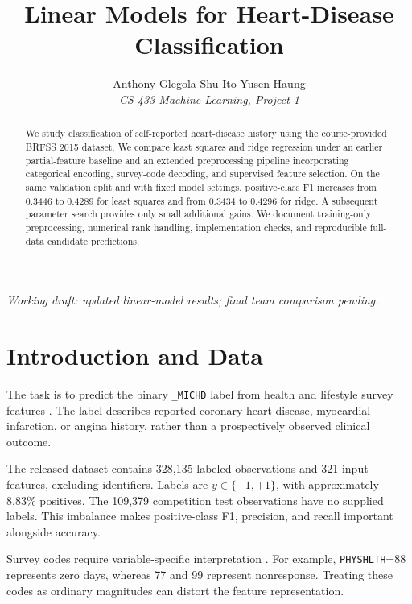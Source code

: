 \documentclass[10pt,conference,compsocconf]{IEEEtran}
\begin{document}
\title{Linear Models for Heart-Disease Classification}
\author{
  Anthony Glegola \qquad Shu Ito \qquad Yusen Haung\\
  \textit{CS-433 Machine Learning, Project 1}
}
\maketitle

\begin{center}
\footnotesize
\textit{Working draft: updated linear-model results;
final team comparison pending.}
\end{center}

\begin{abstract}
We study classification of self-reported heart-disease history
using the course-provided BRFSS 2015 dataset. We compare least
squares and ridge regression under an earlier partial-feature
baseline and an extended preprocessing pipeline incorporating
categorical encoding, survey-code decoding, and supervised
feature selection. On the same validation split and with fixed
model settings, positive-class F1 increases from 0.3446 to
0.4289 for least squares and from 0.3434 to 0.4296 for ridge.
A subsequent parameter search provides only small additional
gains. We document training-only preprocessing, numerical
rank handling, implementation checks, and reproducible
full-data candidate predictions.
\end{abstract}

\section{Introduction and Data}
The task is to predict the binary \texttt{\_MICHD} label from
health and lifestyle survey features \cite{course,brfss}.
The label describes reported coronary heart disease,
myocardial infarction, or angina history, rather than a
prospectively observed clinical outcome.

The released dataset contains 328,135 labeled observations
and 321 input features, excluding identifiers. Labels are
$y\in\{-1,+1\}$, with approximately 8.83\% positives.
The 109,379 competition test observations have no supplied
labels. This imbalance makes positive-class F1, precision,
and recall important alongside accuracy.

Survey codes require variable-specific interpretation
\cite{codebook}. For example, \texttt{PHYSHLTH}=88 represents
zero days, whereas 77 and 99 represent nonresponse.
Treating these codes as ordinary magnitudes can distort
the feature representation.
\end{document}
